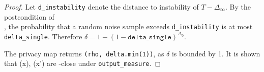 \documentclass{article}
\begin{document}
\begin{proof}
    Let \texttt{d\_instability} denote the distance to instability of $T - \Delta_\infty$.
    By the postcondition of \\ ,
    the probability that a random noise sample exceeds \texttt{d\_instability} is at most \texttt{delta\_single}.
    Therefore $\delta = 1 - (1 - \texttt{delta\_single})^{\Delta_0}$.

    The privacy map returns \texttt{(rho, delta.min(1))}, as $\delta$ is bounded by 1.
    It is shown that \function(x), \function(x') are \dout-close under \texttt{output\_measure}.
\end{proof}



\end{document}
